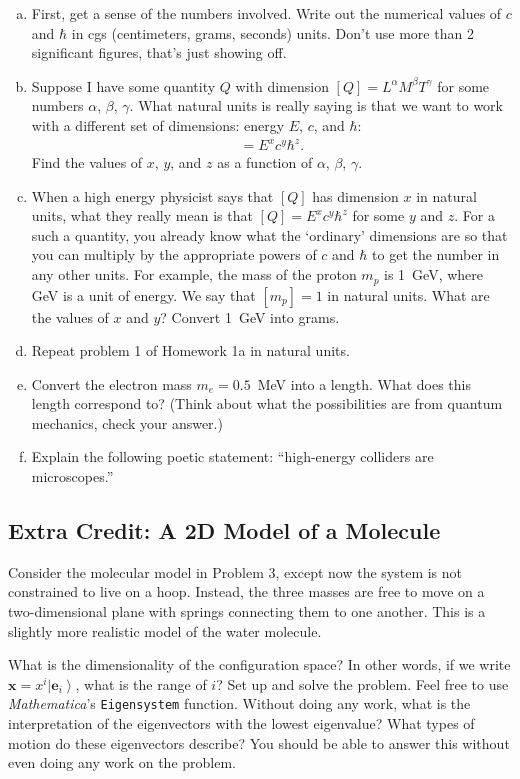\documentclass[12pt]{article}
\numberwithin{equation}{subsection}    %
\renewcommand{\vec}[1]{\mathbf{#1}} %
\begin{document}
\begin{enumerate}[(a)]
	\item First, get a sense of the numbers involved. Write out the numerical values of $c$ and $\hbar$ in cgs (centimeters, grams, seconds) units. Don't use more than 2 significant figures, that's just showing off. 
	\item Suppose I have some quantity $Q$ with dimension $[Q] = L^\alpha M^\beta T^\gamma$ for some numbers $\alpha$, $\beta$, $\gamma$. What natural units is really saying is that we want to work with a different set of dimensions: energy $E$, $c$, and $\hbar$:
		\begin{align*}
			[Q] = E^x c^y \hbar^z .
		\end{align*}
		Find the values of $x$, $y$, and $z$ as a function of $\alpha$, $\beta$, $\gamma$.
	\item When a high energy physicist says that $[Q]$ has dimension $x$ in natural units, what they really mean is that $[Q] = E^x c^y \hbar^z$ for some $y$ and $z$. For a such a quantity, you already know what the `ordinary' dimensions are so that you can multiply by the appropriate powers of $c$ and $\hbar$ to get the number in any other units. For example, the mass of the proton $m_p$ is 1~GeV, where GeV is a unit of energy. We say that $[m_p] = 1$ in natural units. What are the values of $x$ and $y$? Convert 1~GeV into grams.
	\item Repeat problem 1 of Homework 1a in natural units.
	\item Convert the electron mass $m_e = 0.5$~MeV into a length. What does this length correspond to? (Think about what the possibilities are from quantum mechanics, check your answer.)
	\item Explain the following poetic statement: ``high-energy colliders are microscopes.''
\end{enumerate}


\subsection{Extra Credit: A 2D Model of a Molecule}


Consider the molecular model in Problem 3, except now the system is not constrained to live on a hoop. Instead, the three masses are free to move on a two-dimensional plane with springs connecting them to one another. This is a slightly more realistic model of the water molecule. 

What is the dimensionality of the configuration space? In other words, if we write $\vec{x} = x^i \left|\vec{e}_i\right\rangle$, what is the range of $i$? Set up and solve the problem. Feel free to use \emph{Mathematica}'s \texttt{Eigensystem} function. Without doing any work, what is the interpretation of the eigenvectors with the lowest eigenvalue? What types of motion do these eigenvectors describe? You should be able to answer this without even doing any work on the problem.
\end{document}
